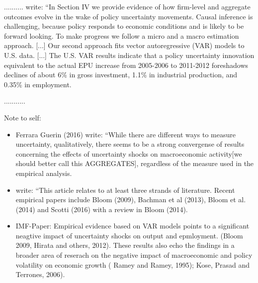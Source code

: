 \documentclass[a4paper,11pt,listof=nochaptergap,oneside,pointednumbers,bibtotoc,bigheadings,liststotoc]{scrbook}
\begin{document}
\citet{bakeretal:15} ..........
\citet[p. 1595]{bakeretal:15} write: ``In Section IV we provide evidence of how firm-level and aggregate outcomes evolve in the wake of policy uncertainty movements. Causal inference is challenging, because policy responds to economic conditions and is likely to be forward looking. To make progress we follow a micro and a macro estimation approach. [...] Our second approach fits vector autoregressive (VAR) models to U.S. data. [...] The U.S. VAR results indicate that a policy uncertainty innovation equivalent to the actual EPU increase from 2005-2006 to 2011-2012 foreshadows declines of about 6\% in gross investment, 1.1\% in industrial production, and 0.35\% in employment. 


\citet{juradoetal:15}...........



\begingroup
    \fontsize{8pt}{12pt}\selectfont
    Note to self:
\begin{itemize}
	\item Ferrara Guerin (2016) write: ``While there are different ways to measure uncertainty, qualitatively, there seems to be a strong convergense of results concerning the effects of uncertainty shocks on macroeconomic activity[we should better call this AGGREGATES], regardless of the measure used in the empirical analysis.
	\item \citet[p. 1597]{bakeretal:15} write: ``This article relates to at least three strands of literature. Recent empirical papers include Bloom (2009), Bachman et al (2013), Bloom et al. (2014) and Scotti (2016) with a review in Bloom (2014).\\
 \item IMF-Paper: Empirical evidence based on VAR models points to a significant neagtive impact of uncertainty shocks on output and epmloyment. (Bloom 2009, Hirata and others, 2012). These results also echo the findings in a broader area of reserach on the negative impact of macroeconomic and policy volatility on economic growth ( Ramey and Ramey, 1995); Kose, Prasad and Terrones, 2006).\\
\end{itemize}
\endgroup
\end{document}
